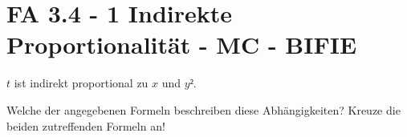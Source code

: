 \section{FA 3.4 - 1 Indirekte Proportionalität - MC - BIFIE}

\begin{beispiel}[FA 3.4]{1} %
$t$ ist indirekt proportional zu $x$ und $y²$.

Welche der angegebenen Formeln beschreiben diese Abhängigkeiten? Kreuze die beiden zutreffenden Formeln an!
\end{beispiel}